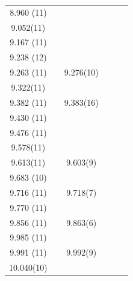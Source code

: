 \begin{center}
\begin{longtable}{cc cc cc}
  8.960 (11)      &          &                  &                     &             &                 \\
   9.052(11)      &          &                  &                     &             &                 \\
  9.167 (11)      &          &                  &                     &             &                 \\
  9.238 (12)      &          &                  &                     &             &                 \\
  9.263 (11)      &          &  9.276(10)       &                     &             &                 \\
   9.322(11)      &          &                  &                     &             &                 \\
  9.382 (11)      &          &  9.383(16)       &                     &             &                 \\
  9.430 (11)      &          &                  &                     &             &                 \\
  9.476 (11)      &          &                  &                     &             &                 \\
   9.578(11)      &          &                  &                     &             &                 \\
   9.613(11)      &          &  9.603(9)        &                     &             &                 \\
  9.683 (10)      &          &                  &                     &             &                 \\
  9.716 (11)      &          &  9.718(7)        &                     &             &                 \\
  9.770 (11)      &          &                  &                     &             &                 \\
  9.856 (11)      &          &  9.863(6)        &                     &             &                 \\
  9.985 (11)      &          &                  &                     &             &                 \\
  9.991 (11)      &          &  9.992(9)        &                     &             &                 \\
  10.040(10)      &          &                  &                     &             &                 \\

\end{longtable}
\end{center}
